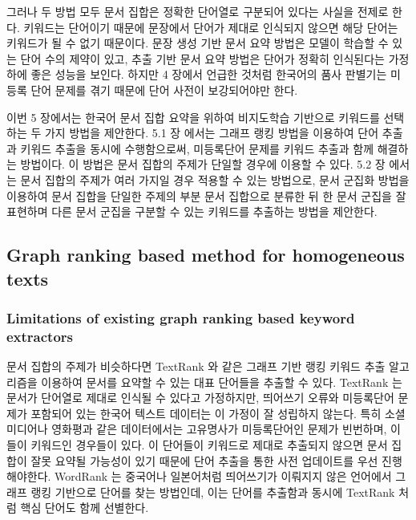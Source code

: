 \documentclass[11pt]{article}
\begin{document}
그러나 두 방법 모두 문서 집합은 정확한 단어열로 구분되어 있다는 사실을 전제로 한다.
키워드는 단어이기 때문에 문장에서 단어가 제대로 인식되지 않으면 해당 단어는 키워드가 될 수 없기 때문이다.
문장 생성 기반 문서 요약 방법은 모델이 학습할 수 있는 단어 수의 제약이 있고, 추출 기반 문서 요약 방법은 단어가 정확히 인식된다는 가정 하에 좋은 성능을 보인다.
하지만 4 장에서 언급한 것처럼 한국어의 품사 판별기는 미등록 단어 문제를 겪기 때문에 단어 사전이 보강되어야만 한다.

이번 5 장에서는 한국어 문서 집합 요약을 위하여 비지도학습 기반으로 키워드를 선택하는 두 가지 방법을 제안한다.
5.1 장 에서는 그래프 랭킹 방법을 이용하여 단어 추출과 키워드 추출을 동시에 수행함으로써, 미등록단어 문제를 키워드 추출과 함께 해결하는 방법이다.
이 방법은 문서 집합의 주제가 단일할 경우에 이용할 수 있다.
5.2 장 에서는 문서 집합의 주제가 여러 가지일 경우 적용할 수 있는 방법으로, 문서 군집화 방법을 이용하여 문서 집합을 단일한 주제의 부분 문서 집합으로 분류한 뒤 한 문서 군집을 잘 표현하며 다른 문서 군집을 구분할 수 있는 키워드를 추출하는 방법을 제안한다.

\subsection{Graph ranking based method for homogeneous texts}

\subsubsection{Limitations of existing graph ranking based keyword extractors}

문서 집합의 주제가 비슷하다면 TextRank \citep{mihalcea2004textrank}와 같은 그래프 기반 랭킹 키워드 추출 알고리즘을 이용하여 문서를 요약할 수 있는 대표 단어들을 추출할 수 있다.
TextRank 는 문서가 단어열로 제대로 인식될 수 있다고 가정하지만, 띄어쓰기 오류와 미등록단어 문제가 포함되어 있는 한국어 텍스트 데이터는 이 가정이 잘 성립하지 않는다.
특히 소셜미디어나 영화평과 같은 데이터에서는 고유명사가 미등록단어인 문제가 빈번하며, 이들이 키워드인 경우들이 있다.
이 단어들이 키워드로 제대로 추출되지 않으면 문서 집합이 잘못 요약될 가능성이 있기 때문에 단어 추출을 통한 사전 업데이트를 우선 진행해야한다.
WordRank \citep{chen2011simple} 는 중국어나 일본어처럼 띄어쓰기가 이뤄지지 않은 언어에서 그래프 랭킹 기반으로 단어를 찾는 방법인데, 이는 단어를 추출함과 동시에 TextRank 처럼 핵심 단어도 함께 선별한다.
\end{document}
